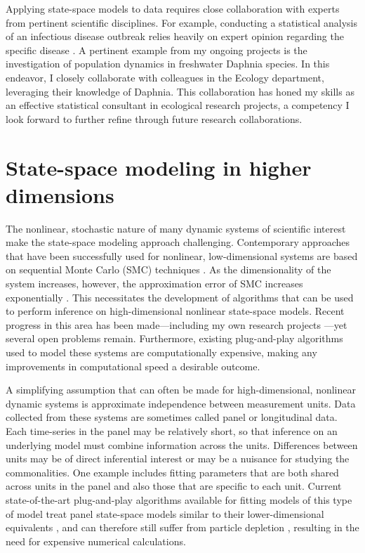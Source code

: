 \documentclass{article}
\begin{document}
Applying state-space models to data requires close collaboration with experts from pertinent scientific disciplines.
For example, conducting a statistical analysis of an infectious disease outbreak relies heavily on expert opinion regarding the specific disease \cite{wheeler24}.
A pertinent example from my ongoing projects is the investigation of population dynamics in freshwater Daphnia species.
In this endeavor, I closely collaborate with colleagues in the Ecology department, leveraging their knowledge of Daphnia.
This collaboration has honed my skills as an effective statistical consultant in ecological research projects, a competency I look forward to further refine through future research collaborations.


\section{State-space modeling in higher dimensions}\label{sec:methods}

The nonlinear, stochastic nature of many dynamic systems of scientific interest make the state-space modeling approach challenging.
Contemporary approaches that have been successfully used for nonlinear, low-dimensional systems are based on sequential Monte Carlo (SMC) techniques \cite{ionides06,andrieu10,ionides15}.
As the dimensionality of the system increases, however, the approximation error of SMC increases exponentially \cite{bengtsson08,snyder08}.
This necessitates the development of algorithms that can be used to perform inference on high-dimensional nonlinear state-space models.
Recent progress in this area has been made---including my own research projects \cite{ionides22,wheeler24}---yet several open problems remain.
Furthermore, existing plug-and-play algorithms used to model these systems are computationally expensive, making any improvements in computational speed a desirable outcome.

A simplifying assumption that can often be made for high-dimensional, nonlinear dynamic systems is approximate independence between measurement units.
Data collected from these systems are sometimes called panel or longitudinal data.
Each time-series in the panel may be relatively short, so that inference on an underlying model must combine information across the units.
Differences between units may be of direct inferential interest or may be a nuisance for studying the commonalities.
One example includes fitting parameters that are both shared across units in the panel and also those that are specific to each unit.
Current state-of-the-art plug-and-play algorithms available for fitting models of this type of model treat panel state-space models similar to their lower-dimensional equivalents \cite{breto20}, and can therefore still suffer from particle depletion \cite{snyder08}, resulting in the need for expensive numerical calculations.
\end{document}
